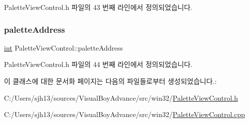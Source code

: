 Palette\+View\+Control.\+h 파일의 43 번째 라인에서 정의되었습니다.

\mbox{\label{class_palette_view_control_a53b2efd4174e06a68e545608e458947b}} 
\subsubsection{\texorpdfstring{palette\+Address}{paletteAddress}}
{\footnotesize\ttfamily \mbox{\hyperlink{_util_8cpp_a0ef32aa8672df19503a49fab2d0c8071}{int}} Palette\+View\+Control\+::palette\+Address\hspace{0.3cm}{\ttfamily [protected]}}



Palette\+View\+Control.\+h 파일의 44 번째 라인에서 정의되었습니다.



이 클래스에 대한 문서화 페이지는 다음의 파일들로부터 생성되었습니다.\+:\begin{DoxyCompactItemize}
\item 
C\+:/\+Users/sjh13/sources/\+Visual\+Boy\+Advance/src/win32/\mbox{\hyperlink{_palette_view_control_8h}{Palette\+View\+Control.\+h}}\item 
C\+:/\+Users/sjh13/sources/\+Visual\+Boy\+Advance/src/win32/\mbox{\hyperlink{_palette_view_control_8cpp}{Palette\+View\+Control.\+cpp}}\end{DoxyCompactItemize}

